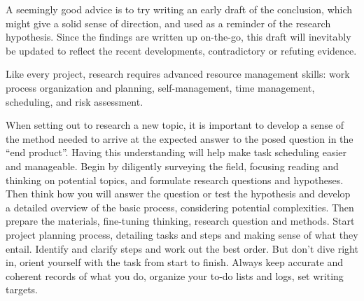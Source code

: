\documentclass[10pt,a4paper,twocolumn]{article}
\begin{document}
A seemingly good advice is to try writing an early draft of the conclusion, which might
give a solid sense of direction, and used as a reminder of the research hypothesis. Since
the findings are written up on-the-go, this draft will inevitably be updated to reflect the
recent developments, contradictory or refuting evidence.

Like every project, research requires advanced resource management skills: work process
organization and planning, self-management, time management, scheduling, and risk assessment.

When setting out to research a new topic, it is important to develop a sense of the method
needed to arrive at the expected answer to the posed question in the ``end product''. Having
this understanding will help make task scheduling easier and manageable.
%
Begin by diligently surveying the field, focusing reading and thinking on potential topics,
and formulate research questions and hypotheses. Then think how you will answer the question
or test the hypothesis and develop a detailed overview of the basic process, considering
potential complexities.
%
Then prepare the materials, fine-tuning thinking, research question and methods. Start project
planning process, detailing tasks and steps and making sense of what they entail. Identify and
clarify steps and work out the best order. But don't dive right in, orient yourself with the
task from start to finish. Always keep accurate and coherent records of what you do, organize
your to-do lists and logs, set writing targets.

\end{document}
